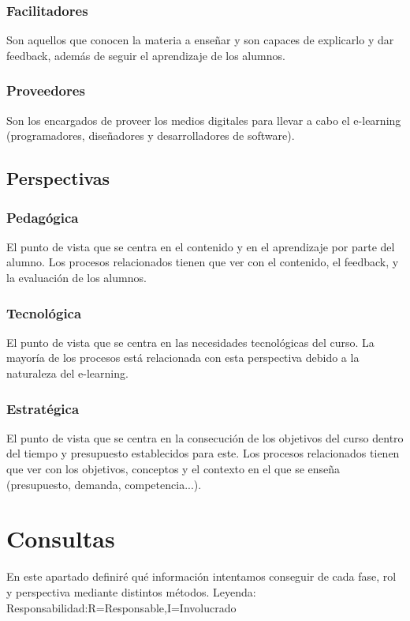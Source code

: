 \subsubsection{Facilitadores}
Son aquellos que conocen la materia a enseñar y son capaces de explicarlo y dar feedback, además de seguir el aprendizaje de los alumnos.

\subsubsection{Proveedores}
Son los encargados de proveer los medios digitales para llevar a cabo el e-learning (programadores, diseñadores y desarrolladores de software).

\subsection{Perspectivas}

\subsubsection{Pedagógica}
El punto de vista que se centra en el contenido y en el aprendizaje por parte del alumno. Los procesos relacionados tienen que ver con el contenido, el feedback, y la evaluación de los alumnos.

\subsubsection{Tecnológica}
El punto de vista que se centra en las necesidades tecnológicas del curso. La mayoría de los procesos está relacionada con esta perspectiva debido a la naturaleza del e-learning.

\subsubsection{Estratégica}
El punto de vista que se centra en la consecución de los objetivos del curso dentro del tiempo y presupuesto establecidos para este. Los procesos relacionados tienen que ver con los objetivos, conceptos y el contexto en el que se enseña (presupuesto, demanda, competencia...).


\section{Consultas}
En este apartado definiré qué información intentamos conseguir de cada fase, rol y perspectiva mediante distintos métodos.
Leyenda:
Responsabilidad:R=Responsable,I=Involucrado

